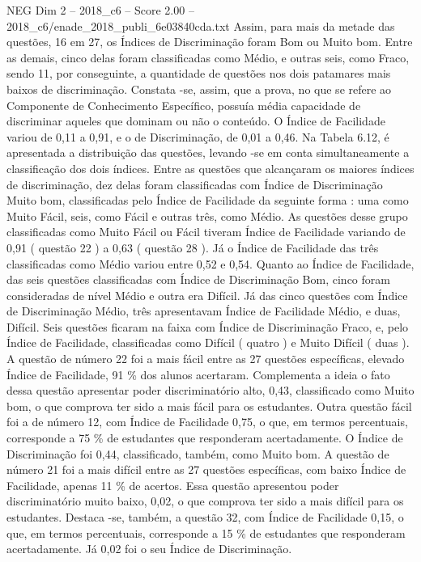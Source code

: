 \begin{textsample}{NEG Dim 2 – 2018\_c6 – Score 2.00 – 2018\_c6/enade\_2018\_publi\_6e03840cda.txt}
Assim, para mais da metade das questões, 16 em 27, os Índices de Discriminação foram Bom ou Muito bom.
Entre as demais, cinco delas foram classificadas como Médio, e outras seis, como Fraco, sendo 11, por conseguinte, a quantidade de questões nos dois patamares mais baixos de discriminação.
Constata -se, assim, que a prova, no que se refere ao Componente de Conhecimento Específico, possuía média capacidade de discriminar aqueles que dominam ou não o conteúdo.
O Índice de Facilidade variou de 0,11 a 0,91, e o de Discriminação, de 0,01 a 0,46.
Na Tabela 6.12, é apresentada a distribuição das questões, levando -se em conta simultaneamente a classificação dos dois índices.
Entre as questões que alcançaram os maiores índices de discriminação, dez delas foram classificadas com Índice de Discriminação Muito bom, classificadas pelo Índice de Facilidade da seguinte forma : uma como Muito Fácil, seis, como Fácil e outras três, como Médio.
As questões desse grupo classificadas como Muito Fácil ou Fácil tiveram Índice de Facilidade variando de 0,91 ( questão 22 ) a 0,63 ( questão 28 ).
Já o Índice de Facilidade das três classificadas como Médio variou entre 0,52 e 0,54.
Quanto ao Índice de Facilidade, das seis questões classificadas com Índice de Discriminação Bom, cinco foram consideradas de nível Médio e outra era Difícil.
Já das cinco questões com Índice de Discriminação Médio, três apresentavam Índice de Facilidade Médio, e duas, Difícil.
Seis questões ficaram na faixa com Índice de Discriminação Fraco, e, pelo Índice de Facilidade, classificadas como Difícil ( quatro ) e Muito Difícil ( duas ).
A questão de número 22 foi a mais fácil entre as 27 questões específicas, elevado Índice de Facilidade, 91 \% dos alunos acertaram.
Complementa a ideia o fato dessa questão apresentar poder discriminatório alto, 0,43, classificado como Muito bom, o que comprova ter sido a mais fácil para os estudantes.
Outra questão fácil foi a de número 12, com Índice de Facilidade 0,75, o que, em termos percentuais, corresponde a 75 \% de estudantes que responderam acertadamente.
O Índice de Discriminação foi 0,44, classificado, também, como Muito bom.
A questão de número 21 foi a mais difícil entre as 27 questões específicas, com baixo Índice de Facilidade, apenas 11 \% de acertos.
Essa questão apresentou poder discriminatório muito baixo, 0,02, o que comprova ter sido a mais difícil para os estudantes.
Destaca -se, também, a questão 32, com Índice de Facilidade 0,15, o que, em termos percentuais, corresponde a 15 \% de estudantes que responderam acertadamente.
Já 0,02 foi o seu Índice de Discriminação.

\end{textsample}
